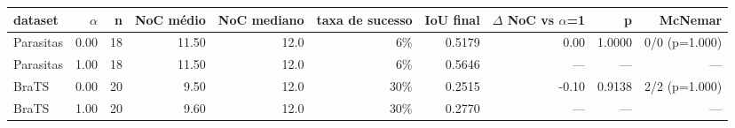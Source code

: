 \begin{adjustbox}{max width=\linewidth}
\begin{tabular}{lrrrrrrrrr}
\toprule
dataset & $\alpha$ & n & NoC médio & NoC mediano & taxa de sucesso & IoU final & $\Delta$ NoC vs $\alpha$=1 & p & McNemar \\
\midrule
Parasitas & 0.00 & 18 & 11.50 & 12.0 & 6\% & 0.5179 & 0.00 & 1.0000 & 0/0 (p=1.000) \\
Parasitas & 1.00 & 18 & 11.50 & 12.0 & 6\% & 0.5646 & --- & --- & --- \\
BraTS & 0.00 & 20 & 9.50 & 12.0 & 30\% & 0.2515 & -0.10 & 0.9138 & 2/2 (p=1.000) \\
BraTS & 1.00 & 20 & 9.60 & 12.0 & 30\% & 0.2770 & --- & --- & --- \\
\bottomrule
\end{tabular}
\end{adjustbox}
